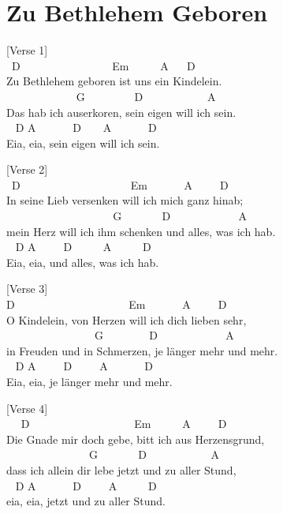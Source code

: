 \documentclass[
  letterpaper,
  twoside=false]{scrbook}
\begin{document}
\hypertarget{zu-bethlehem-geboren}{%
\chapter{Zu Bethlehem Geboren}\label{zu-bethlehem-geboren}}

{[}Verse 1{]}\\
\hspace*{0.333em} ~D ~ ~ ~ ~ ~ ~ ~ ~ ~ ~Em ~ ~ ~ A ~ ~D\\
Zu Bethlehem geboren ist uns ein Kindelein.\\
\hspace*{0.333em} ~ ~ ~ ~ ~ ~ ~ ~G ~ ~ ~ ~ ~ D ~ ~ ~ ~ ~ ~ ~A\\
Das hab ich auserkoren, sein eigen will ich sein.\\
\hspace*{0.333em} ~ D A ~ ~ ~ ~D ~ ~ A ~ ~ ~ ~D\\
Eia, eia, sein eigen will ich sein.

{[}Verse 2{]}\\
\hspace*{0.333em} ~D ~ ~ ~ ~ ~ ~ ~ ~ ~ ~ ~ ~Em ~ ~ ~ ~A ~ ~ ~D\\
In seine Lieb versenken will ich mich ganz hinab;\\
\hspace*{0.333em} ~ ~ ~ ~ ~ ~ ~ ~ ~ ~ ~ ~G ~ ~ ~ ~ D ~ ~ ~ ~ ~ ~ ~ A\\
mein Herz will ich ihm schenken und alles, was ich hab.\\
\hspace*{0.333em} ~ D A ~ ~ ~D ~ ~ ~ A ~ ~ ~ D\\
Eia, eia, und alles, was ich hab.

{[}Verse 3{]}\\
\hspace*{0.333em} D ~ ~ ~ ~ ~ ~ ~ ~ ~ ~ ~ ~ Em ~ ~ ~ ~A ~ ~ ~D\\
O Kindelein, von Herzen will ich dich lieben sehr,\\
\hspace*{0.333em} ~ ~ ~ ~ ~ ~ ~ ~ ~ ~G ~ ~ ~ ~ ~D ~ ~ ~ ~ ~ ~ ~ A\\
in Freuden und in Schmerzen, je länger mehr und mehr.\\
\hspace*{0.333em} ~ D A ~ ~ ~D ~ ~ ~A ~ ~ ~ ~D\\
Eia, eia, je länger mehr und mehr.

{[}Verse 4{]}\\
\hspace*{0.333em} ~ ~D ~ ~ ~ ~ ~ ~ ~ ~ ~ ~ ~ Em ~ ~ ~ A ~ ~ ~D\\
Die Gnade mir doch gebe, bitt ich aus Herzensgrund,\\
\hspace*{0.333em} ~ ~ ~ ~ ~ ~ ~ ~ ~ G ~ ~ ~ ~ D ~ ~ ~ ~ ~ ~ ~A\\
dass ich allein dir lebe jetzt und zu aller Stund,\\
\hspace*{0.333em} ~ D A ~ ~ ~ ~D ~ ~ ~A ~ ~ ~ D\\
eia, eia, jetzt und zu aller Stund.
\end{document}
